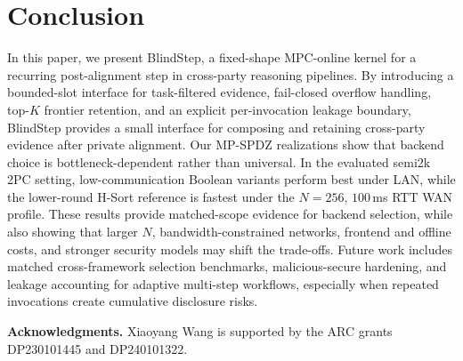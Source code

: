 \documentclass[conference,compsoc,letterpaper]{IEEEtran}
\theoremstyle{definition}
\theoremstyle{remark}
\newcommand{\BlindStep}{BlindStep\xspace}
\newcommand{\HSort}{H-Sort}
\begin{document}
\section{Conclusion}
\vspace{-2mm}
\label{sec:conclusion}

In this paper, we
present \BlindStep{}, a fixed-shape MPC-online kernel for a recurring post-alignment step in cross-party reasoning pipelines.
By introducing a bounded-slot interface for task-filtered evidence, fail-closed overflow handling, top-$K$ frontier retention, and an explicit per-invocation leakage boundary, \BlindStep{} provides a small interface for composing and retaining cross-party evidence after private alignment.
Our MP-SPDZ realizations show that backend choice is bottleneck-dependent rather than universal.
In the evaluated semi2k 2PC setting, low-communication Boolean variants perform best under LAN, while the lower-round \HSort{} reference is fastest under the $N=256$, $100$\,ms RTT WAN profile.
These results provide matched-scope evidence for backend selection, while also showing that larger $N$, bandwidth-constrained networks, frontend and offline costs, and stronger security models may shift the trade-offs.
Future work includes matched cross-framework selection benchmarks, malicious-secure hardening, and leakage accounting for adaptive multi-step workflows, especially when repeated invocations create cumulative disclosure risks.

\vspace{2mm}
\noindent
\textbf{Acknowledgments.}
Xiaoyang Wang is supported by the ARC grants DP230101445 and DP240101322.
\end{document}

